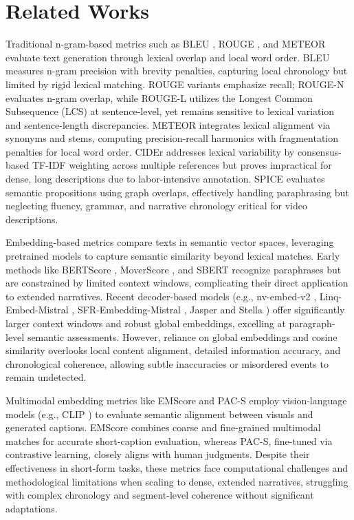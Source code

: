 \section{Related Works}

Traditional n-gram-based metrics such as BLEU \cite{papineni2002bleu}, ROUGE \cite{lin2004rouge}, and METEOR \cite{banerjee2005meteor} evaluate text generation through lexical overlap and local word order. BLEU measures n-gram precision with brevity penalties, capturing local chronology but limited by rigid lexical matching. ROUGE variants emphasize recall; ROUGE-N evaluates n-gram overlap, while ROUGE-L utilizes the Longest Common Subsequence (LCS) at sentence-level, yet remains sensitive to lexical variation and sentence-length discrepancies. METEOR integrates lexical alignment via synonyms and stems, computing precision-recall harmonics with fragmentation penalties for local word order. CIDEr \cite{vedantam2015cider} addresses lexical variability by consensus-based TF-IDF weighting across multiple references but proves impractical for dense, long descriptions due to labor-intensive annotation. SPICE \cite{anderson2016spice} evaluates semantic propositions using graph overlaps, effectively handling paraphrasing but neglecting fluency, grammar, and narrative chronology critical for video descriptions.

Embedding-based metrics compare texts in semantic vector spaces, leveraging pretrained models to capture semantic similarity beyond lexical matches. Early methods like BERTScore \cite{zhang2019bertscore}, MoverScore \cite{zhao2019moverscore}, and SBERT \cite{reimers2019sentence} recognize paraphrases but are constrained by limited context windows, complicating their direct application to extended narratives. Recent decoder-based models (e.g., nv-embed-v2 \cite{lee2024nv}, Linq-Embed-Mistral \cite{choi2024linq}, SFR-Embedding-Mistral \cite{meng2024sfrembedding}, Jasper and Stella \cite{zhang2024jasper}) offer significantly larger context windows and robust global embeddings, excelling at paragraph-level semantic assessments. However, reliance on global embeddings and cosine similarity overlooks local content alignment, detailed information accuracy, and chronological coherence, allowing subtle inaccuracies or misordered events to remain undetected.

Multimodal embedding metrics like EMScore \cite{shi2022emscore} and PAC-S \cite{sarto2023positive} employ vision-language models (e.g., CLIP \cite{radford2021learning}) to evaluate semantic alignment between visuals and generated captions. EMScore combines coarse and fine-grained multimodal matches for accurate short-caption evaluation, whereas PAC-S, fine-tuned via contrastive learning, closely aligns with human judgments. Despite their effectiveness in short-form tasks, these metrics face computational challenges and methodological limitations when scaling to dense, extended narratives, struggling with complex chronology and segment-level coherence without significant adaptations.


